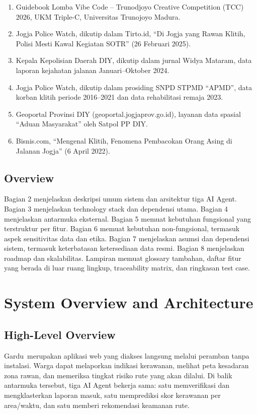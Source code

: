\documentclass[11pt,a4paper]{article}
\newcommand{\appname}{Gardu}
\begin{document}
\begin{enumerate}
  \item Guidebook Lomba Vibe Code -- Trunodjoyo Creative Competition (TCC) 2026, UKM Triple-C, Universitas Trunojoyo Madura.
  \item Jogja Police Watch, dikutip dalam Tirto.id, ``Di Jogja yang Rawan Klitih, Polisi Mesti Kawal Kegiatan SOTR'' (26 Februari 2025).
  \item Kepala Kepolisian Daerah DIY, dikutip dalam jurnal Widya Mataram, data laporan kejahatan jalanan Januari--Oktober 2024.
  \item Jogja Police Watch, dikutip dalam prosiding SNPD STPMD ``APMD'', data korban klitih periode 2016--2021 dan data rehabilitasi remaja 2023.
  \item Geoportal Provinsi DIY (geoportal.jogjaprov.go.id), layanan data spasial ``Aduan Masyarakat'' oleh Satpol PP DIY.
  \item Bisnis.com, ``Mengenal Klitih, Fenomena Pembacokan Orang Asing di Jalanan Jogja'' (6 April 2022).
\end{enumerate}

\subsection{Overview}

Bagian 2 menjelaskan deskripsi umum sistem dan arsitektur tiga AI Agent. Bagian 3 menjelaskan technology stack dan dependensi utama. Bagian 4 menjelaskan antarmuka eksternal. Bagian 5 memuat kebutuhan fungsional yang terstruktur per fitur. Bagian 6 memuat kebutuhan non-fungsional, termasuk aspek sensitivitas data dan etika. Bagian 7 menjelaskan asumsi dan dependensi sistem, termasuk keterbatasan ketersediaan data resmi. Bagian 8 menjelaskan roadmap dan skalabilitas. Lampiran memuat glossary tambahan, daftar fitur yang berada di luar ruang lingkup, traceability matrix, dan ringkasan test case.

\newpage

\section{System Overview and Architecture}

\subsection{High-Level Overview}
\appname\ merupakan aplikasi web yang diakses langsung melalui peramban tanpa instalasi. Warga dapat melaporkan indikasi kerawanan, melihat peta kesadaran zona rawan, dan memeriksa tingkat risiko rute yang akan dilalui. Di balik antarmuka tersebut, tiga AI Agent bekerja sama: satu memverifikasi dan mengklasterkan laporan masuk, satu memprediksi skor kerawanan per area/waktu, dan satu memberi rekomendasi keamanan rute.
\end{document}

